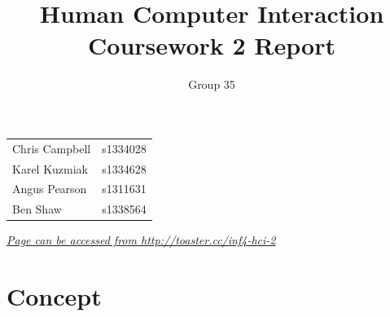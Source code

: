 \documentclass[a4paper, notoc]{tufte-handout}
\title{Human Computer Interaction\\ Coursework 2 Report}
\author{Group 35}
\begin{document}
\maketitle %
\vspace{1em}
\noindent
\begin{tabular}{l r}
  Chris Campbell & s1334028\\
  Karel Kuzmiak  & s1334628\\
  Angus Pearson  & s1311631\\
  Ben Shaw       & s1338564\\
\end{tabular}


\vspace{1em}
\noindent
\href{http://toaster.cc/inf4-hci-2}{\textit{Page can be accessed from http://toaster.cc/inf4-hci-2}}


\section{Concept}\label{sec:concept}
\end{document}
